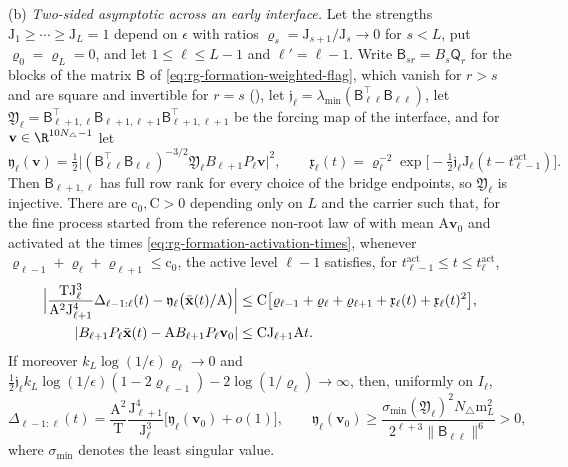 (b) \emph{Two-sided asymptotic across an early interface.} Let the strengths
\(\mathrm J_1\ge\cdots\ge\mathrm J_L=1\) depend on \(\epsilon\) with ratios
\(\varrho_s=\mathrm J_{s+1}/\mathrm J_s\to0\) for \(s<L\), put \(\varrho_0=\varrho_L=0\), and
let \(1\le\ell\le L-1\) and \(\ell'=\ell-1\). Write
\(\mathsf B_{sr}=B_s\mathsf Q_r\) for the blocks of the matrix \(\mathsf B\)
of \cref{eq:rg-formation-weighted-flag}, which vanish for \(r>s\) and are
square and invertible for \(r=s\) (), let
\(\mathfrak j_\ell=\lambda_{\min}(\mathsf B_{\ell\ell}^\top\mathsf B_{\ell\ell})\),
let \(\mathfrak Y_\ell=\mathsf B_{\ell+1,\ell}^\top\mathsf B_{\ell+1,\ell+1}\mathsf B_{\ell+1,\ell+1}^\top\)
be the forcing map of the interface, and for
\(\mathbf v\in\R^{10N_\triangle-1}\) let
\begin{equation}
\mathfrak y_\ell(\mathbf v)=\tfrac12\bigl|(\mathsf B_{\ell\ell}^\top\mathsf B_{\ell\ell})^{-3/2}
\mathfrak Y_\ell B_{\ell+1}P_\ell\mathbf v\bigr|^2,
\qquad
\mathfrak x_\ell(t)=\varrho_\ell^{-2}\exp\bigl[-\tfrac12\mathfrak j_\ell\mathrm J_\ell(t-t^{\mathrm{act}}_{\ell-1})\bigr].
\label{eq:rg-formation-core-coefficient}
\end{equation}
Then \(\mathsf B_{\ell+1,\ell}\) has full row rank for every choice of the
bridge endpoints, so \(\mathfrak Y_\ell\) is injective. There are
\(\mathrm c_0,\mathrm C>0\) depending only on \(L\) and the carrier such
that, for the fine process started from the reference non-root law of
 with mean \(\mathrm A\mathbf v_0\) and
activated at the times \cref{eq:rg-formation-activation-times}, whenever
\(\varrho_{\ell-1}+\varrho_\ell+\varrho_{\ell+1}\le\mathrm c_0\), the active level \(\ell-1\)
satisfies, for \(t^{\mathrm{act}}_{\ell-1}\le t\le t^{\mathrm{act}}_\ell\),
\begin{equation}
\begin{aligned}
\Bigl|\frac{\mathrm T\mathrm J_\ell^3}{\mathrm A^2\mathrm J_{\ell+1}^4}
\Delta_{\ell-1:\ell}(t)-\mathfrak y_\ell\bigl(\bar{\mathbf x}(t)/\mathrm A\bigr)\Bigr|
&\le\mathrm C\bigl[\varrho_{\ell-1}+\varrho_\ell+\varrho_{\ell+1}+\mathfrak x_\ell(t)+\mathfrak x_\ell(t)^2\bigr],\\
|B_{\ell+1}P_\ell\bar{\mathbf x}(t)-\mathrm AB_{\ell+1}P_\ell\mathbf v_0|
&\le\mathrm C\mathrm J_{\ell+1}\mathrm At.
\end{aligned}
\label{eq:rg-formation-core-two-sided}
\end{equation}
If moreover \(k_L\log(1/\epsilon)\varrho_\ell\to0\) and
\(\tfrac12\mathfrak j_\ell k_L\log(1/\epsilon)(1-2\varrho_{\ell-1})-2\log(1/\varrho_\ell)\to\infty\),
then, uniformly on \(I_\ell\),
\begin{equation}
\Delta_{\ell-1:\ell}(t)
=\frac{\mathrm A^2}{\mathrm T}\frac{\mathrm J_{\ell+1}^4}{\mathrm J_\ell^3}
\bigl[\mathfrak y_\ell(\mathbf v_0)+o(1)\bigr],
\qquad
\mathfrak y_\ell(\mathbf v_0)
\ge\frac{\sigma_{\min}(\mathfrak Y_\ell)^2N_\triangle\mathrm m_L^2}{2^{\ell+3}\|\mathsf B_{\ell\ell}\|^6}>0,
\label{eq:rg-formation-core-window}
\end{equation}
where \(\sigma_{\min}\) denotes the least singular value.

